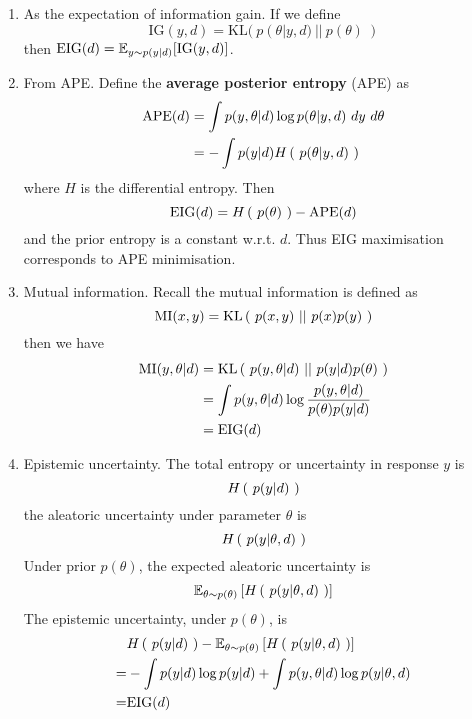 \begin{enumerate}
\item As the expectation of information gain. If we define
\begin{equation}
	\text{IG}(y, d) = \text{KL}(\ p(\theta | y, d)\ ||\ p(\theta)\ ) 
\end{equation}
then $\text{EIG}(d) = \mathbb{E}_{y\sim p(y|d)}[\text{IG}(y, d)] $.
\item From APE. Define the \textbf{average posterior entropy} (APE) as 
\begin{align}
	\ape(d) &= \int p(y, \theta | d) \log p(\theta | y, d) \ dy \ d\theta \\
	&= -\int p(y|d) \entropy{p(\theta | y, d)}
\end{align}
where $H$ is the differential entropy.
Then
\begin{equation}
	\text{EIG}(d) = H\left(\ p(\theta)\ \right) - \text{APE}(d)
\end{equation}
and the prior entropy is a constant w.r.t. $d$. Thus EIG maximisation corresponds to APE
minimisation.
\item Mutual information. Recall the mutual information is defined as
\begin{equation}
	\text{MI}(x, y) = \text{KL}\left(\ p(x, y)\ ||\ p(x)p(y)\ \right)
\end{equation}
then we have
\begin{align}
	\text{MI}(y, \theta | d) &= \text{KL}\left(\ p(y, \theta | d)\ ||\ p(y|d)p(\theta)\ \right) \\
	&= \int p(y, \theta | d) \log \frac{p(y, \theta | d)}{p(\theta)p(y|d)} \\
	&= \text{EIG}(d)
\end{align}
\item Epistemic uncertainty.
The total entropy or uncertainty in response $y$ is
\begin{equation}
	H\left(\ p(y|d)\ \right)
\end{equation}
the aleatoric uncertainty under parameter $\theta$ is
\begin{equation}
	H\left(\ p(y|\theta, d)\ \right)
\end{equation}
Under prior $p(\theta)$, the expected aleatoric uncertainty is
\begin{equation}
	\mathbb{E}_{\theta \sim p(\theta)}\left[ H\left(\ p(y|\theta, d)\ \right) \right]
\end{equation}
The epistemic uncertainty, under $p(\theta)$, is
\begin{align}
	&H\left(\ p(y|d)\ \right) - \mathbb{E}_{\theta \sim p(\theta)}\left[ H\left(\ p(y|\theta, d)\ \right) \right] \\
	=&-\int p(y|d)\log p(y|d) + \int p(y, \theta | d)\log p(y|\theta, d)\\
	=& \text{EIG}(d)
\end{align}

\end{enumerate}


